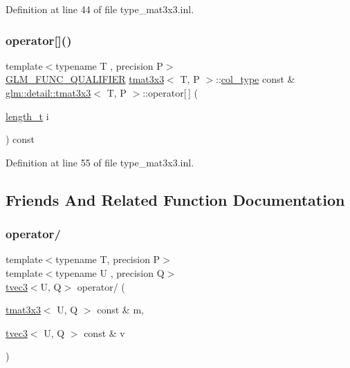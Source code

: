 Definition at line 44 of file type\+\_\+mat3x3.\+inl.

\mbox{\label{structglm_1_1detail_1_1tmat3x3_a6f7965e71a4572bcd50a98f6b91e396b}} 
\subsubsection{\texorpdfstring{operator[]()}{operator[]()}\hspace{0.1cm}{\footnotesize\ttfamily [2/2]}}
{\footnotesize\ttfamily template$<$typename T , precision P$>$ \\
\hyperlink{setup_8hpp_a33fdea6f91c5f834105f7415e2a64407}{G\+L\+M\+\_\+\+F\+U\+N\+C\+\_\+\+Q\+U\+A\+L\+I\+F\+I\+ER} \hyperlink{structglm_1_1detail_1_1tmat3x3}{tmat3x3}$<$ T, P $>$\+::\hyperlink{structglm_1_1detail_1_1tmat3x3_ad47f3a11bd4333d1103bfa93a86fa54f}{col\+\_\+type} const  \& \hyperlink{structglm_1_1detail_1_1tmat3x3}{glm\+::detail\+::tmat3x3}$<$ T, P $>$\+::operator\mbox{[}$\,$\mbox{]} (\begin{DoxyParamCaption}\item[{\hyperlink{namespaceglm_a090a0de2260835bee80e71a702492ed9}{length\+\_\+t}}]{i }\end{DoxyParamCaption}) const}



Definition at line 55 of file type\+\_\+mat3x3.\+inl.



\subsection{Friends And Related Function Documentation}
\mbox{\label{structglm_1_1detail_1_1tmat3x3_ac84f82f1605a6094a397c84daa80a201}} 
\subsubsection{\texorpdfstring{operator/}{operator/}\hspace{0.1cm}{\footnotesize\ttfamily [1/2]}}
{\footnotesize\ttfamily template$<$typename T, precision P$>$ \\
template$<$typename U , precision Q$>$ \\
\hyperlink{structglm_1_1detail_1_1tvec3}{tvec3}$<$U, Q$>$ operator/ (\begin{DoxyParamCaption}\item[{\hyperlink{structglm_1_1detail_1_1tmat3x3}{tmat3x3}$<$ U, Q $>$ const \&}]{m,  }\item[{\hyperlink{structglm_1_1detail_1_1tvec3}{tvec3}$<$ U, Q $>$ const \&}]{v }\end{DoxyParamCaption})\hspace{0.3cm}{\ttfamily [friend]}}

